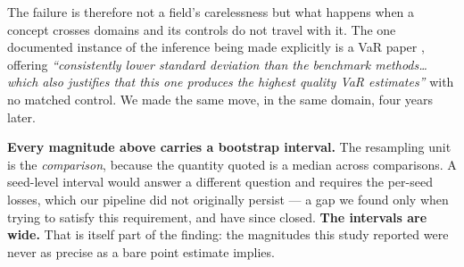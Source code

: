 The failure is therefore not a field's carelessness but what happens when a concept crosses
domains and its controls do not travel with it. The one documented instance of the inference
being made explicitly is a VaR paper \citep{petnehazi2021quantile}, offering \emph{``consistently lower standard
deviation than the benchmark methods\ldots{} which also justifies that this one produces the highest
quality VaR estimates''} with no matched control. We made the same move, in the same domain, four
years later.

\textbf{Every magnitude above carries a bootstrap interval.} The resampling unit is the
\emph{comparison}, because the quantity quoted is a median across comparisons. A seed-level interval
would answer a different question and requires the per-seed losses, which our pipeline did not
originally persist --- a gap we found only when trying to satisfy this requirement, and have since
closed. \textbf{The intervals are wide.} That is itself part of the finding: the magnitudes this
study reported were never as precise as a bare point estimate implies.
